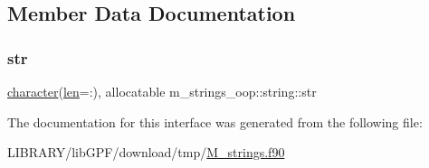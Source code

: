 \subsection{Member Data Documentation}
\mbox{\label{structm__strings__oop_1_1string_a52469ac69ef806468520b42894ca5e77}} 
\subsubsection{\texorpdfstring{str}{str}}
{\footnotesize\ttfamily \hyperlink{option__stopwatch_83_8txt_abd4b21fbbd175834027b5224bfe97e66}{character}(\hyperlink{structm__strings__oop_1_1string_acd9093a5a0ca686837cce1908846ae53}{len}=\+:), allocatable m\+\_\+strings\+\_\+oop\+::string\+::str\hspace{0.3cm}{\ttfamily [private]}}



The documentation for this interface was generated from the following file\+:\begin{DoxyCompactItemize}
\item 
L\+I\+B\+R\+A\+R\+Y/lib\+G\+P\+F/download/tmp/\hyperlink{M__strings_8f90}{M\+\_\+strings.\+f90}\end{DoxyCompactItemize}
